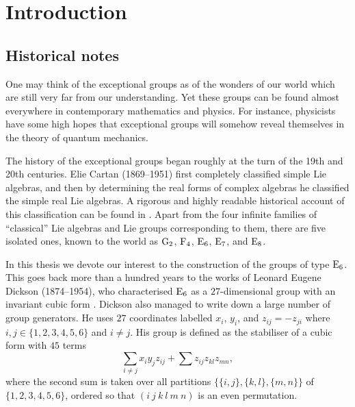 \chapter{Introduction}
\ifpdf
    \graphicspath{{Introduction/IntroductionFigs/PNG/}{Introduction/IntroductionFigs/PDF/}{Introduction/IntroductionFigs/}}
\else
    \graphicspath{{Introduction/IntroductionFigs/EPS/}{Introduction/IntroductionFigs/}}
\fi
\label{Intro}

\section{{Historical notes}}

One may think of the exceptional groups as of the wonders of our
world which are still very far from our understanding. Yet these
groups can be found almost everywhere in contemporary mathematics
and physics. For instance, physicists have some high hopes that
exceptional groups will somehow reveal themselves in the theory
of quantum mechanics. 

The history of the exceptional groups began roughly at the turn
of the 19th and 20th centuries. Elie Cartan (1869--1951)
first completely classified simple Lie algebras, and then by 
determining the real forms of complex algebras he classified the
simple real Lie algebras. A rigorous and highly readable historical
account of this classification can be found in 
\cite{HawkinsThomas}. Apart from the four infinite families
of ``classical'' Lie algebras and Lie groups corresponding to
them, there are five isolated ones, known to the world as
$\mathrm{G}_2$, $\mathrm{F}_4$, $\mathrm{E}_6$, $\mathrm{E}_7$, and $\mathrm{E}_8$.

In this thesis we devote our interest to the construction of the
groups of type $\mathrm{E}_6$. This goes back more than a hundred years
to the works of Leonard Eugene Dickson (1874--1954),
who characterised $\mathrm{E}_6$ as a $27$-dimensional group with an
invariant cubic form \cite{Dickson1, Dickson2}. 
Dickson also managed to write down a 
large number of group generators. He uses $27$ coordinates
labelled $x_i$, $y_i$, and $z_{ij} = -z_{ji}$ where 
$i,j \in \{1,2,3,4,5,6\}$ and $i \neq j$. His group is defined
as the stabiliser of a cubic form with $45$ terms
\begin{equation}
	\sum\limits_{i \neq j} x_i y_j z_{ij} + 
	\sum z_{ij} z_{kl} z_{mn},
\end{equation}
where the second sum is taken over all partitions 
$\{\{i, j\}, \{k, l\}, \{m, n\}\}$ of 
$\{1,2,3,4,5,6\}$, ordered so that $(i\ j\ k\ l\ m\ n)$ is 
an even permutation.

